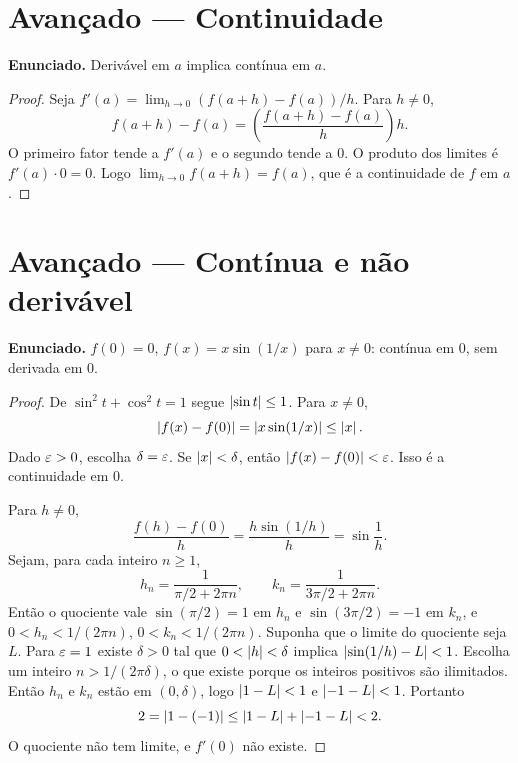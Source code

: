 \documentclass[11pt,a4paper]{article}
\begin{document}
\section{Avan\c{c}ado --- Continuidade}

\textbf{Enunciado.} Deriv\'avel em $a$ implica cont\'inua em $a$.

\begin{proof}
Seja $f'(a)=\lim_{h\to 0}(f(a+h)-f(a))/h$. Para $h\neq 0$,
\[
f(a+h)-f(a)=\left(\frac{f(a+h)-f(a)}{h}\right) h.
\]
O primeiro fator tende a $f'(a)$ e o segundo tende a $0$. O produto dos limites \'e $f'(a)\cdot 0=0$. Logo $\lim_{h\to 0}f(a+h)=f(a)$, que \'e a continuidade de $f$ em $a$.
\end{proof}

\section{Avan\c{c}ado --- Cont\'inua e n\~ao deriv\'avel}

\textbf{Enunciado.} $f(0)=0$, $f(x)=x\sin(1/x)$ para $x\neq 0$: cont\'inua em $0$, sem derivada em $0$.

\begin{proof}
De $\sin^2 t+\cos^2 t=1$ segue $\left\lvert \sin t \right\rvert\le 1$. Para $x\neq 0$,
\[
\left\lvert f(x)-f(0) \right\rvert=\left\lvert x\sin(1/x) \right\rvert\le \left\lvert x \right\rvert.
\]
Dado $\varepsilon>0$, escolha $\delta=\varepsilon$. Se $\left\lvert x \right\rvert<\delta$, ent\~ao $\left\lvert f(x)-f(0) \right\rvert<\varepsilon$. Isso \'e a continuidade em $0$.

Para $h\neq 0$,
\[
\frac{f(h)-f(0)}{h}=\frac{h\sin(1/h)}{h}=\sin\frac{1}{h}.
\]
Sejam, para cada inteiro $n\ge 1$,
\[
h_n=\frac{1}{\pi/2+2\pi n}, \qquad k_n=\frac{1}{3\pi/2+2\pi n}.
\]
Ent\~ao o quociente vale $\sin(\pi/2)=1$ em $h_n$ e $\sin(3\pi/2)=-1$ em $k_n$, e $0<h_n<1/(2\pi n)$, $0<k_n<1/(2\pi n)$. Suponha que o limite do quociente seja $L$. Para $\varepsilon=1$ existe $\delta>0$ tal que $0<\left\lvert h \right\rvert<\delta$ implica $\left\lvert \sin(1/h)-L \right\rvert<1$. Escolha um inteiro $n>1/(2\pi\delta)$, o que existe porque os inteiros positivos s\~ao ilimitados. Ent\~ao $h_n$ e $k_n$ est\~ao em $(0,\delta)$, logo $\left\lvert 1-L \right\rvert<1$ e $\left\lvert -1-L \right\rvert<1$. Portanto
\[
2=\left\lvert 1-(-1) \right\rvert\le \left\lvert 1-L \right\rvert+\left\lvert -1-L \right\rvert<2.
\]
O quociente n\~ao tem limite, e $f'(0)$ n\~ao existe.
\end{proof}
\end{document}
